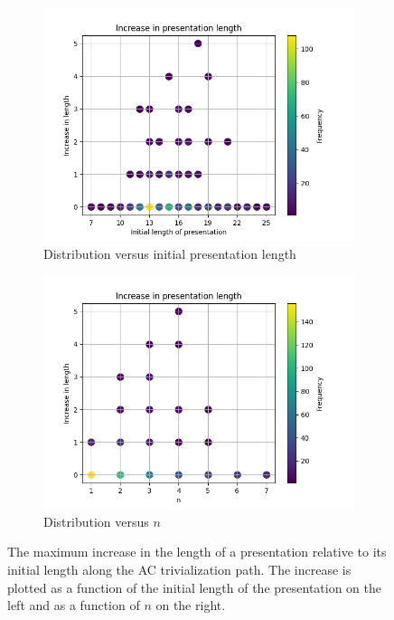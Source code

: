 \begin{figure}
	\centering
	\begin{subfigure}[b]{0.5\textwidth}
		\includegraphics[width=\textwidth]{fig/gs_length_increase_vs_length.png}
		\caption{Distribution versus initial presentation length}
		\label{fig:gs_length_increase_vs_length}
	\end{subfigure}%
	\begin{subfigure}[b]{0.5\textwidth}
		\centering
		\includegraphics[width=1.1\textwidth]{fig/gs_length_increase_vs_n.png}
		\caption{Distribution versus $n$}
		\label{fig:gs_length_increase_vs_n}
	\end{subfigure}
	\caption{The maximum increase in the length of a presentation relative to its initial length along the AC trivialization path. The increase is plotted as a function of the initial length of the presentation on the left and as a function of $n$ on the right.} \label{fig:gs_length_increase}
\end{figure}

